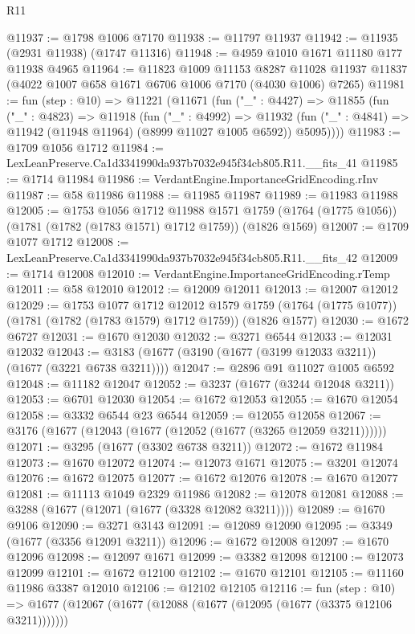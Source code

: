 \begin{lexlean}{R11}
\begin{coremodule}
@11937 := @1798 @1006 @7170
@11938 := @11797 @11937
@11942 := @11935 (@2931 @11938) (@1747 @11316)
@11948 := @4959 @1010 @1671 @11180 @177 @11938 @4965
@11964 := @11823
    @1009
    @11153
    @8287
    @11028
    @11937
    @11837
    (@4022 @1007 @658 @1671 @6706 @1006 @7170 (@4030 @1006) @7265)
@11981 := fun (step : @10) =>
  @11221
    (@11671
      (fun ("_" : @4427) =>
      @11855
        (fun ("_" : @4823) =>
        @11918
          (fun ("_" : @4992) =>
          @11932 (fun ("_" : @4841) => @11942 (@11948 @11964) (@8999 @11027 @1005 @6592)) @5095))))
@11983 := @1709 @1056 @1712
@11984 := LexLeanPreserve.Ca1d3341990da937b7032e945f34cb805.R11.__fits_41
@11985 := @1714 @11984
@11986 := VerdantEngine.ImportanceGridEncoding.rInv
@11987 := @58 @11986
@11988 := @11985 @11987
@11989 := @11983 @11988
@12005 := @1753
    @1056
    @1712
    @11988
    @1571
    @1759
    (@1764 (@1775 @1056))
    (@1781 (@1782 (@1783 @1571) @1712 @1759))
    (@1826 @1569)
@12007 := @1709 @1077 @1712
@12008 := LexLeanPreserve.Ca1d3341990da937b7032e945f34cb805.R11.__fits_42
@12009 := @1714 @12008
@12010 := VerdantEngine.ImportanceGridEncoding.rTemp
@12011 := @58 @12010
@12012 := @12009 @12011
@12013 := @12007 @12012
@12029 := @1753
    @1077
    @1712
    @12012
    @1579
    @1759
    (@1764 (@1775 @1077))
    (@1781 (@1782 (@1783 @1579) @1712 @1759))
    (@1826 @1577)
@12030 := @1672 @6727
@12031 := @1670 @12030
@12032 := @3271 @6544
@12033 := @12031 @12032
@12043 := @3183 (@1677 (@3190 (@1677 (@3199 @12033 @3211)) (@1677 (@3221 @6738 @3211))))
@12047 := @2896 @91 @11027 @1005 @6592
@12048 := @11182 @12047
@12052 := @3237 (@1677 (@3244 @12048 @3211))
@12053 := @6701 @12030
@12054 := @1672 @12053
@12055 := @1670 @12054
@12058 := @3332 @6544 @23 @6544
@12059 := @12055 @12058
@12067 := @3176 (@1677 (@12043 (@1677 (@12052 (@1677 (@3265 @12059 @3211))))))
@12071 := @3295 (@1677 (@3302 @6738 @3211))
@12072 := @1672 @11984
@12073 := @1670 @12072
@12074 := @12073 @1671
@12075 := @3201 @12074
@12076 := @1672 @12075
@12077 := @1672 @12076
@12078 := @1670 @12077
@12081 := @11113 @1049 @2329 @11986
@12082 := @12078 @12081
@12088 := @3288 (@1677 (@12071 (@1677 (@3328 @12082 @3211))))
@12089 := @1670 @9106
@12090 := @3271 @3143
@12091 := @12089 @12090
@12095 := @3349 (@1677 (@3356 @12091 @3211))
@12096 := @1672 @12008
@12097 := @1670 @12096
@12098 := @12097 @1671
@12099 := @3382 @12098
@12100 := @12073 @12099
@12101 := @1672 @12100
@12102 := @1670 @12101
@12105 := @11160 @11986 @3387 @12010
@12106 := @12102 @12105
@12116 := fun (step : @10) =>
  @1677 (@12067 (@1677 (@12088 (@1677 (@12095 (@1677 (@3375 @12106 @3211)))))))

\end{coremodule}
\end{lexlean}
